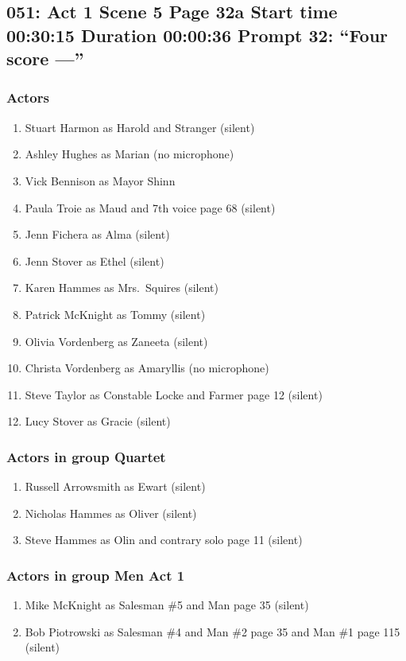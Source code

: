 \subsection{051: Act 1 Scene 5 Page 32a Start time 00:30:15 Duration 00:00:36 Prompt 32: ``Four score ---''}

\subsubsection{Actors}
\begin{enumerate}
\item Stuart Harmon as Harold and Stranger (silent)
\item Ashley Hughes as Marian (no microphone)
\item Vick Bennison as Mayor Shinn
\item Paula Troie as Maud and 7th voice page 68 (silent)
\item Jenn Fichera as Alma (silent)
\item Jenn Stover as Ethel (silent)
\item Karen Hammes as Mrs.~Squires (silent)
\item Patrick McKnight as Tommy (silent)
\item Olivia Vordenberg as Zaneeta (silent)
\item Christa Vordenberg as Amaryllis (no microphone)
\item Steve Taylor as Constable Locke and Farmer page 12 (silent)
\item Lucy Stover as Gracie (silent)
\end{enumerate}
\subsubsection{Actors in group Quartet}
\begin{enumerate}
\item Russell Arrowsmith as Ewart (silent)
\item Nicholas Hammes as Oliver (silent)
\item Steve Hammes as Olin and contrary solo page 11 (silent)
\end{enumerate}
\subsubsection{Actors in group Men Act 1}
\begin{enumerate}
\item Mike McKnight as Salesman \#5 and Man page 35 (silent)
\item Bob Piotrowski as Salesman \#4 and Man \#2 page 35 and Man \#1 page 115 (silent)
\end{enumerate}

